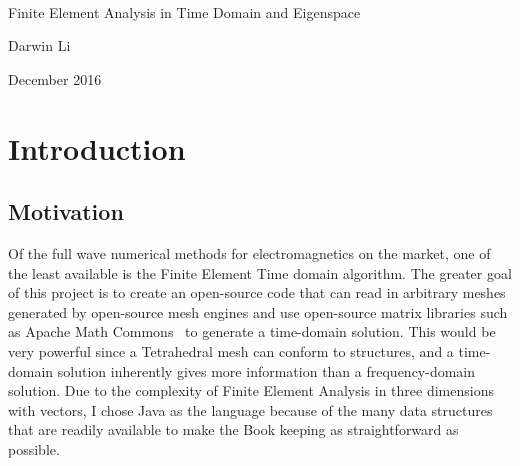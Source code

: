 \documentclass[11pt,a4paper,oldfontcommands]{memoir}
\begin{document}
%
%
\thispagestyle{empty}

{%
\sffamily
\centering
\Large

~\vspace{\fill}

{\huge 
Finite Element Analysis in Time Domain and Eigenspace
}

\vspace{2.5cm}

{\LARGE
Darwin Li
}


\vspace{\fill}

December 2016

}%

\cleardoublepage

\tableofcontents*

\clearpage


\chapter{Introduction}

\section{Motivation}
Of the full wave numerical methods for electromagnetics on the market, one of the least available is the Finite Element Time domain algorithm. The greater goal of this project is to create an open-source code that can read in arbitrary meshes generated by open-source mesh engines and use open-source matrix libraries such as Apache Math Commons~\cite{ApacheMathCommon} to generate a time-domain solution. This would be very powerful since a Tetrahedral mesh can conform to structures, and a time-domain solution inherently gives more information than a frequency-domain solution. Due to the complexity of Finite Element Analysis in three dimensions with vectors, I chose Java as the language because of the many data structures that are readily available to make the Book keeping as straightforward as possible.
\end{document}
